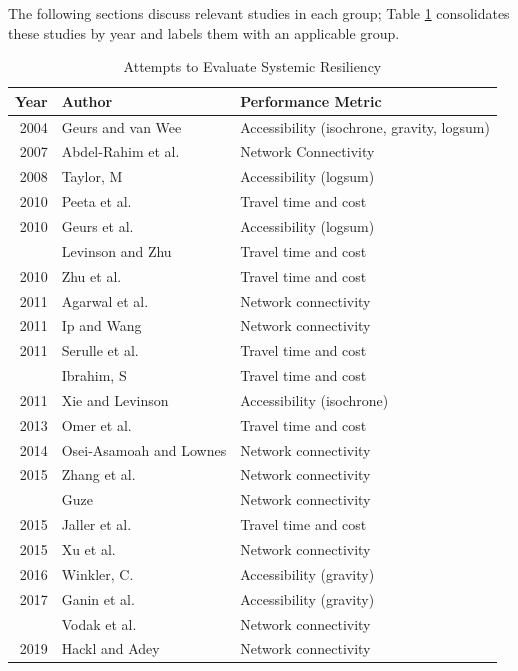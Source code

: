 \documentclass[3p, authoryear]{elsarticle} %
\begin{document}
The following sections discuss relevant studies in each group; Table
\ref{tab:authortable} consolidates these studies by year and labels them with
an applicable group.

\begin{table}

\caption{\label{tab:authortable}Attempts to Evaluate Systemic Resiliency}
\centering
\begin{tabular}[t]{rll}
\toprule
Year & Author & Performance Metric\\
\midrule
2004 & Geurs and van Wee & Accessibility (isochrone, gravity, logsum)\\
2007 & Abdel-Rahim et al. & Network Connectivity\\
2008 & Taylor, M & Accessibility (logsum)\\
2010 & Peeta et al. & Travel time and cost\\
2010 & Geurs et al. & Accessibility (logsum)\\
\addlinespace
2010 & Levinson and Zhu & Travel time and cost\\
2010 & Zhu et al. & Travel time and cost\\
2011 & Agarwal et al. & Network connectivity\\
2011 & Ip and Wang & Network connectivity\\
2011 & Serulle et al. & Travel time and cost\\
\addlinespace
2011 & Ibrahim, S & Travel time and cost\\
2011 & Xie and Levinson & Accessibility (isochrone)\\
2013 & Omer et al. & Travel time and cost\\
2014 & Osei-Asamoah and Lownes & Network connectivity\\
2015 & Zhang et al. & Network connectivity\\
\addlinespace
2015 & Guze & Network connectivity\\
2015 & Jaller et al. & Travel time and cost\\
2015 & Xu et al. & Network connectivity\\
2016 & Winkler, C. & Accessibility (gravity)\\
2017 & Ganin et al. & Accessibility (gravity)\\
\addlinespace
2019 & Vodak et al. & Network connectivity\\
2019 & Hackl and Adey & Network connectivity\\
\bottomrule
\end{tabular}
\end{table}
\end{document}
